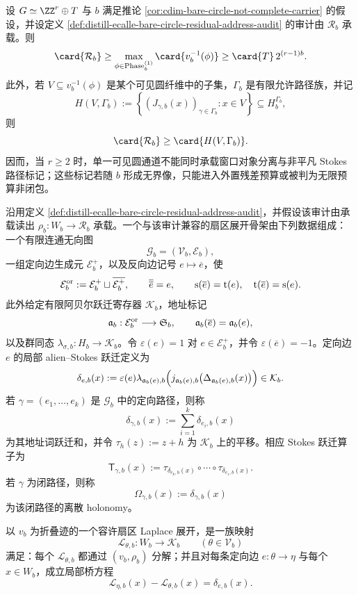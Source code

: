 \begin{proposition}\label{prop:distill-ecalle-bare-circle-stokes-residual-separation}
设 \(G\simeq\ZZ^r\oplus T\) 与 \(b\) 满足推论
\ref{cor:cdim-bare-circle-not-complete-carrier} 的假设，并设定义
\ref{def:distill-ecalle-bare-circle-residual-address-audit} 的审计由
\(\mathcal R_b\) 承载。则
\[
\card{\mathcal R_b}\ge \max_{\phi\in\mathrm{Phase}_b^{(1)}}
\card{v_b^{-1}(\phi)}\ge \card{T}\,2^{(r-1)b}.
\]
此外，若 \(V\subseteq v_b^{-1}(\phi)\) 是某个可见圆纤维中的子集，\(\Gamma_b\) 是有限允许路径族，并记
\[
H(V,\Gamma_b):=\left\{(J_{\gamma,b}(x))_{\gamma\in\Gamma_b}:x\in V\right\}\subseteq H_b^{\Gamma_b},
\]
则
\[
\card{\mathcal R_b}\ge \card{H(V,\Gamma_b)}.
\]
因而，当 \(r\ge2\) 时，单一可见圆通道不能同时承载窗口对象分离与非平凡 Stokes 路径标记；这些标记若随 \(b\) 形成无界像，只能进入外置残差预算或被判为无限预算非闭包。
\end{proposition}
\begin{definition}[单圆残差审计的扇区展开骨架]\label{distill:ecalle_resurgence_mould_calculus_and_alien_derivatives-sectorial_residual_unfolding_theorem-bare-circle-sectorial-skeleton}
沿用定义 \ref{def:distill-ecalle-bare-circle-residual-address-audit}，并假设该审计由承载读出
\(\rho_b:W_b\to\mathcal R_b\) 承载。一个与该审计兼容的扇区展开骨架由下列数据组成：
一个有限连通无向图
\[
\mathcal G_b=(\mathcal V_b,\mathcal E_b),
\]
一组定向边生成元 \(\mathcal E_b^+\)，以及反向边记号 \(e\mapsto \overline e\)，使
\[
\mathcal E_b^{\rm or}:=\mathcal E_b^+\sqcup \overline{\mathcal E_b^+},
\qquad
\overline{\overline e}=e,
\qquad
\operatorname{s}(\overline e)=\operatorname{t}(e),\quad
\operatorname{t}(\overline e)=\operatorname{s}(e).
\]
此外给定有限阿贝尔跃迁寄存器 \(\mathcal K_b\)，地址标记
\[
\mathfrak a_b:\mathcal E_b^{\rm or}\longrightarrow \mathfrak S_b,
\qquad
\mathfrak a_b(\overline e)=\mathfrak a_b(e),
\]
以及群同态 \(\lambda_{\sigma,b}:H_b\to\mathcal K_b\)。令
\(\varepsilon(e)=1\) 对 \(e\in\mathcal E_b^+\)，并令
\(\varepsilon(\overline e)=-1\)。定向边 \(e\) 的局部 alien--Stokes 跃迁定义为
\[
\delta_{e,b}(x):=\varepsilon(e)\lambda_{\mathfrak a_b(e),b}
\Bigl(j_{\mathfrak a_b(e),b}\bigl(\Delta_{\mathfrak a_b(e),b}(x)\bigr)\Bigr)
\in\mathcal K_b.
\]
若 \(\gamma=(e_1,\ldots,e_k)\) 是 \(\mathcal G_b\) 中的定向路径，则称
\[
\delta_{\gamma,b}(x):=\sum_{i=1}^k\delta_{e_i,b}(x)
\]
为其地址词跃迁和，并令 \(\tau_h(z):=z+h\) 为 \(\mathcal K_b\) 上的平移。相应 Stokes 跃迁算子为
\[
\mathsf T_{\gamma,b}(x):=\tau_{\delta_{e_k,b}(x)}\circ\cdots\circ\tau_{\delta_{e_1,b}(x)}.
\]
若 \(\gamma\) 为闭路径，则称
\[
\Omega_{\gamma,b}(x):=\delta_{\gamma,b}(x)
\]
为该闭路径的离散 holonomy。

以 \(v_b\) 为折叠迹的一个容许扇区 Laplace 展开，是一族映射
\[
\mathcal L_{\theta,b}:W_b\longrightarrow\mathcal K_b
\qquad(\theta\in\mathcal V_b)
\]
满足：每个 \(\mathcal L_{\theta,b}\) 都通过 \((v_b,\rho_b)\) 分解；并且对每条定向边
\(e:\theta\to\eta\) 与每个 \(x\in W_b\)，成立局部桥方程
\[
\mathcal L_{\eta,b}(x)-\mathcal L_{\theta,b}(x)=\delta_{e,b}(x).
\]
\end{definition}
